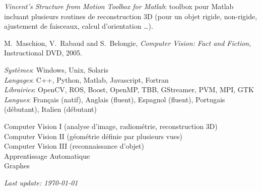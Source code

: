 \begin{llist}
{\em Vincent's Structure from Motion Toolbox for Matlab}: toolbox pour Matlab incluant plusieurs routines de reconstruction 3D (pour un objet rigide, non-rigide, ajustement de faisceaux, calcul d'orientation \dots).

M.~Maschion, V.~Rabaud and S.~Belongie, {\em Computer Vision: Fact and Fiction},
Instructional DVD, 2005.

{\em Syst\`{e}mes}: Windows, Unix, Solaris\\
{\em Langages}: C++, Python, Matlab, Javascript, Fortran \\
{\em Librairies}: OpenCV, ROS, Boost, OpenMP, TBB, GStreamer, PVM, MPI, GTK \\
{\em Langues}: Fran\c{c}ais (natif), Anglais (fluent), Espagnol (fluent), Portugais (d\'{e}butant), Italien 
(d\'{e}butant)

Computer Vision I (analyse d'image, radiom\'{e}trie, reconstruction 3D)\\
Computer Vision II (g\'{e}om\'{e}trie d\'{e}finie par plusieurs vues)\\
Computer Vision III (reconnaissance d'objet)\\
Apprentissage Automatique\\
Graphes\\




\end{llist}

{\em Last update: \today}


